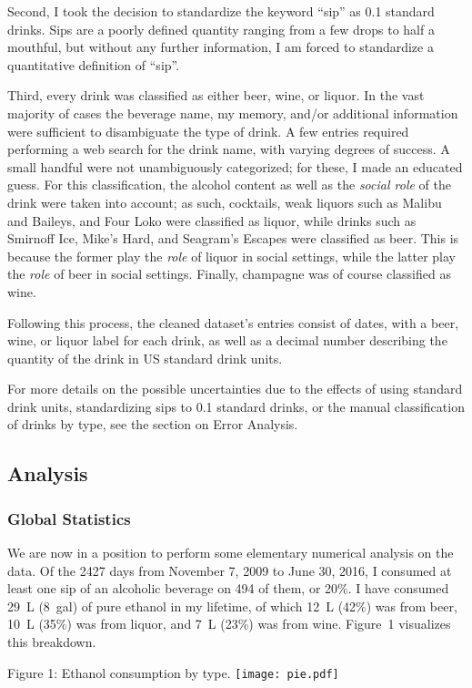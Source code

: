 \documentclass{article}
\begin{document}
\begin{multicols}{2}
	Second, I took the decision to standardize the keyword ``sip'' as 0.1 standard drinks. Sips are a poorly defined quantity ranging from a few drops to half a mouthful, but without any further information, I am forced to standardize a quantitative definition of ``sip''.
	
	Third, every drink was classified as either beer, wine, or liquor. In the vast majority of cases the beverage name, my memory, and/or additional information were sufficient to disambiguate the type of drink. A few entries required performing a web search for the drink name, with varying degrees of success. A small handful were not unambiguously categorized; for these, I made an educated guess. For this classification, the alcohol content as well as the \emph{social role} of the drink were taken into account; as such, cocktails, weak liquors such as Malibu and Baileys, and Four Loko were classified as liquor, while drinks such as Smirnoff Ice, Mike's Hard, and Seagram's Escapes were classified as beer. This is because the former play the \emph{role} of liquor in social settings, while the latter play the \emph{role} of beer in social settings. Finally, champagne was of course classified as wine.

	Following this process, the cleaned dataset's entries consist of dates, with a beer, wine, or liquor label for each drink, as well as a decimal number describing the quantity of the drink in US standard drink units.
	
	For more details on the possible uncertainties due to the effects of using standard drink units, standardizing sips to 0.1 standard drinks, or the manual classification of drinks by type, see the section on Error Analysis.
	\subsection*{Analysis}
	\subsubsection*{Global Statistics}
	We are now in a position to perform some elementary numerical analysis on the data. Of the 2427 days from November 7, 2009 to June 30, 2016, I consumed at least one sip of an alcoholic beverage on 494 of them, or 20\%. I have consumed 29~L (8~gal) of pure ethanol in my lifetime, of which 12~L (42\%) was from beer, 10~L (35\%) was from liquor, and 7~L (23\%) was from wine. Figure~1 visualizes this breakdown.
	\begin{center}
		Figure 1: Ethanol consumption by type.
		\texttt{[image: pie.pdf]}
	\end{center}
	\setcounter{figure}{1}
	

\end{multicols}
\end{document}
